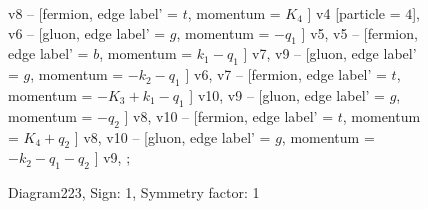 \documentclass{revtex4}
\begin{document}
\begin{figure}[!htb]
\begin{center}
{v8 -- [fermion, edge label' = \(t\), momentum = \(K_{4}\) ] v4 [particle = \(4\)], 
v6 -- [gluon, edge label' = \(g\), momentum = \(-q_{1}\) ] v5, 
v5 -- [fermion, edge label' = \(b\), momentum = \(k_{1} - q_{1}\) ] v7, 
v9 -- [gluon, edge label' = \(g\), momentum = \(-k_{2} - q_{1}\) ] v6, 
v7 -- [fermion, edge label' = \(t\), momentum = \(-K_{3} + k_{1} - q_{1}\) ] v10, 
v9 -- [gluon, edge label' = \(g\), momentum = \(-q_{2}\) ] v8, 
v10 -- [fermion, edge label' = \(t\), momentum = \(K_{4} + q_{2}\) ] v8, 
v10 -- [gluon, edge label' = \(g\), momentum = \(-k_{2} - q_{1} - q_{2}\) ] v9, 
};
\end{center}
\caption{Diagram223, Sign: 1, Symmetry factor: 1}
\end{figure}
\newpage
\end{document}
